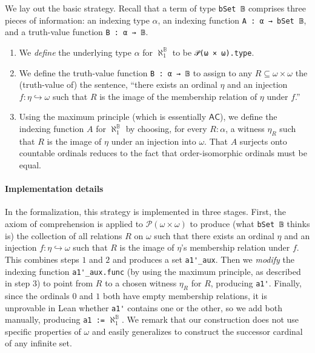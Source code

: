 \documentclass[sigplan,10pt,review, autoref,anonymous]{acmart}
\newcommand{\lil}{\lstinline}
\theoremstyle{definition}
\begin{document}

We lay out the basic strategy. Recall that a term of type \lil{bSet 𝔹} comprises three pieces of information: an indexing type \(\alpha\), an indexing function \lil{A : α → bSet 𝔹}, and a truth-value function \lil{B : α → 𝔹}.
\begin{enumerate}
\item We \emph{define} the underlying type \(\alpha\) for \(\aleph_1^{\mathbb{B}}\) to be \lil{𝒫(ω × ω).type}.
\item We define the truth-value function \lil{B : α → 𝔹} to assign to any \(R \subseteq \omega \times \omega\) the (truth-value of) the sentence, ``there exists an ordinal \(\eta\) and an injection \(f : \eta \hookrightarrow \omega\) such that \(R\) is the image of the membership relation of \(\eta\) under \(f\).''

\item Using the maximum principle (which is essentially \(\mathsf{AC}\)), we define the indexing function \(A\) for \(\aleph_1^{\mathbb{B}}\) by choosing, for every \(R : \alpha\), a witness \(\eta_R\) such that \(R\) is the image of \(\eta\) under an injection into \(\omega\). That \(A\) surjects onto countable ordinals reduces to the fact that order-isomorphic ordinals must be equal.
\end{enumerate}

\paragraph{Implementation details} In the formalization, this strategy is implemented in three stages. First, the axiom of comprehension is applied to \(\mathcal{P}(\omega \times \omega)\) to produce (what \lil{bSet 𝔹} thinks is) the collection of all relations \(R\) on \(\omega\) such that there exists an ordinal \(\eta\) and an injection \(f : \eta \hookrightarrow \omega\) such that \(R\) is the image of \(\eta\)'s membership relation under \(f\). This combines steps \(1\) and \(2\) and produces a set \lil{a1'_aux}. Then we \emph{modify} the indexing function \lil{a1'_aux.func} (by using the maximum principle, as described in step \(3\)) to point from \(R\) to a chosen witness \(\eta_R\) for \(R\), producing \lil{a1'}. Finally, since the ordinals \(0\) and \(1\) both have empty membership relations, it is unprovable in Lean whether \lil{a1'} contains one or the other, so we add both manually, producing \lil{a1 :=} \(\aleph_1^{\mathbb{B}}\). We remark that our construction does not use specific properties of \(\omega\) and easily generalizes to construct the successor cardinal of any infinite set.
\end{document}
